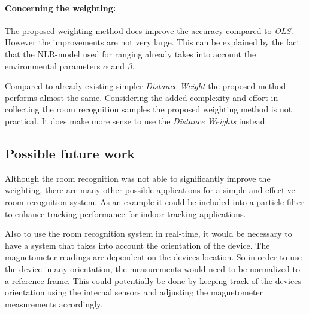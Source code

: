 \paragraph{Concerning the weighting:} 

The proposed weighting method does improve the accuracy compared to \emph{OLS}. However the improvements are not very large. This can be explained by the fact that the NLR-model used for ranging already takes into account the environmental parameters $\alpha$ and $\beta$.

Compared to already existing simpler \emph{Distance Weight} the proposed method performs almost the same. Considering the added complexity and effort in collecting the room recognition samples the proposed weighting method is not practical. It does make more sense to use the \emph{Distance Weights} instead.



\subsection{Possible future work}

Although the room recognition was not able to significantly improve the weighting, there are many other possible applications for a simple and effective room recognition system. As an example it could be included into a particle filter to enhance tracking performance for indoor tracking applications.

Also to use the room recognition system in real-time, it would be necessary to have a system that takes into account the orientation of the device. The magnetometer readings are dependent on the devices location. So in order to use the device in any orientation, the measurements would need to be normalized to a reference frame. This could potentially be done by keeping track of the devices orientation using the internal sensors and adjusting the magnetometer measurements accordingly.